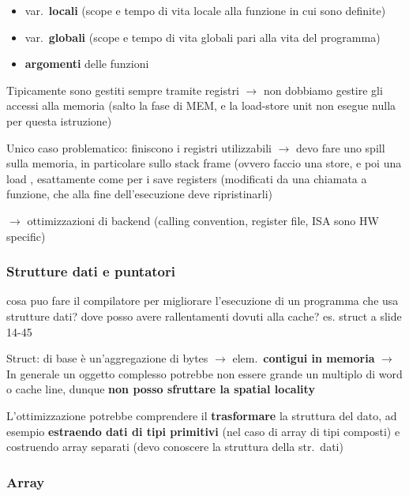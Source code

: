 \begin{itemize}
  \item var.~\textbf{locali} (scope e tempo di vita locale alla funzione in cui sono definite)
  \item var.~\textbf{globali} (scope e tempo di vita globali pari alla vita del programma)
  \item \textbf{argomenti} delle funzioni
\end{itemize}

Tipicamente sono gestiti sempre tramite registri $\rightarrow$ non dobbiamo gestire gli accessi alla memoria (salto la fase di MEM, e la load-store unit non esegue nulla per questa istruzione)

\begin{emphasize}
  Unico caso problematico: finiscono i registri utilizzabili $\rightarrow$ devo fare uno spill sulla memoria, in particolare sullo stack frame (ovvero faccio una store, e poi una load , esattamente come per i save registers (modificati da una chiamata a funzione, che alla fine dell'esecuzione deve ripristinarli)
\end{emphasize}

$\rightarrow$ ottimizzazioni di backend (calling convention, register file, ISA sono HW specific)

\subsubsection{Strutture dati e puntatori}

cosa puo fare il compilatore per migliorare l'esecuzione di un programma che usa strutture dati? dove posso avere rallentamenti dovuti alla cache? es. struct a slide 14-45

Struct: di base \`e un'aggregazione di bytes $\rightarrow$ elem.~\textbf{contigui in memoria} $\rightarrow$ In generale un oggetto complesso potrebbe non essere grande un multiplo di word o cache line, dunque \textbf{non posso sfruttare la spatial locality}

L'ottimizzazione potrebbe comprendere il \textbf{trasformare} la struttura del dato, ad esempio \textbf{estraendo dati di tipi primitivi} (nel caso di array di tipi composti) e costruendo array separati (devo conoscere la struttura della str.~dati)

\subsubsection{Array}


